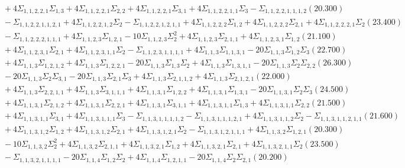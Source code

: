 \documentclass[12pt]{article}
\begin{document}
\begin{landscape}
\begin{align*}
		&\quad\quad +4\Sigma_{1,1,2,2,1}\Sigma_{1,3}+4\Sigma_{1,1,2,2,1}\Sigma_{2,2}+4\Sigma_{1,1,2,2,1}\Sigma_{3,1}+4\Sigma_{1,1,2,2,1,1}\Sigma_{3}-\Sigma_{1,1,2,2,1,1,1,2}(20.300) \\ 
		&\quad\quad -\Sigma_{1,1,2,2,1,1,2,1}+4\Sigma_{1,1,2,2,1,2}\Sigma_{2}-\Sigma_{1,1,2,2,1,2,1,1}+4\Sigma_{1,1,2,2,2}\Sigma_{1,2}+4\Sigma_{1,1,2,2,2}\Sigma_{2,1}+4\Sigma_{1,1,2,2,2,1}\Sigma_{2}(23.400) \\ 
		&\quad\quad -\Sigma_{1,1,2,2,2,1,1,1}+4\Sigma_{1,1,2,3}\Sigma_{1,2,1}-10\Sigma_{1,1,2,3}\Sigma_{2}^{2}+4\Sigma_{1,1,2,3}\Sigma_{2,1,1}+4\Sigma_{1,1,2,3,1}\Sigma_{1,2}(21.100) \\ 
		&\quad\quad +4\Sigma_{1,1,2,3,1}\Sigma_{2,1}+4\Sigma_{1,1,2,3,1,1}\Sigma_{2}-\Sigma_{1,1,2,3,1,1,1,1}+4\Sigma_{1,1,3}\Sigma_{1,1,3,1}-20\Sigma_{1,1,3}\Sigma_{1,2}\Sigma_{3}(22.700) \\ 
		&\quad\quad +4\Sigma_{1,1,3}\Sigma_{1,2,1,2}+4\Sigma_{1,1,3}\Sigma_{1,2,2,1}-20\Sigma_{1,1,3}\Sigma_{1,3}\Sigma_{2}+4\Sigma_{1,1,3}\Sigma_{1,3,1,1}-20\Sigma_{1,1,3}\Sigma_{2}\Sigma_{2,2}(26.300) \\ 
		&\quad\quad -20\Sigma_{1,1,3}\Sigma_{2}\Sigma_{3,1}-20\Sigma_{1,1,3}\Sigma_{2,1}\Sigma_{3}+4\Sigma_{1,1,3}\Sigma_{2,1,1,2}+4\Sigma_{1,1,3}\Sigma_{2,1,2,1}(22.000) \\ 
		&\quad\quad +4\Sigma_{1,1,3}\Sigma_{2,2,1,1}+4\Sigma_{1,1,3}\Sigma_{3,1,1,1}+4\Sigma_{1,1,3,1}\Sigma_{1,2,2}+4\Sigma_{1,1,3,1}\Sigma_{1,3,1}-20\Sigma_{1,1,3,1}\Sigma_{2}\Sigma_{3}(24.500) \\ 
		&\quad\quad +4\Sigma_{1,1,3,1}\Sigma_{2,1,2}+4\Sigma_{1,1,3,1}\Sigma_{2,2,1}+4\Sigma_{1,1,3,1}\Sigma_{3,1,1}+4\Sigma_{1,1,3,1,1}\Sigma_{1,3}+4\Sigma_{1,1,3,1,1}\Sigma_{2,2}(21.500) \\ 
		&\quad\quad +4\Sigma_{1,1,3,1,1}\Sigma_{3,1}+4\Sigma_{1,1,3,1,1,1}\Sigma_{3}-\Sigma_{1,1,3,1,1,1,1,2}-\Sigma_{1,1,3,1,1,1,2,1}+4\Sigma_{1,1,3,1,1,2}\Sigma_{2}-\Sigma_{1,1,3,1,1,2,1,1}(21.600) \\ 
		&\quad\quad +4\Sigma_{1,1,3,1,2}\Sigma_{1,2}+4\Sigma_{1,1,3,1,2}\Sigma_{2,1}+4\Sigma_{1,1,3,1,2,1}\Sigma_{2}-\Sigma_{1,1,3,1,2,1,1,1}+4\Sigma_{1,1,3,2}\Sigma_{1,2,1}(20.300) \\ 
		&\quad\quad -10\Sigma_{1,1,3,2}\Sigma_{2}^{2}+4\Sigma_{1,1,3,2}\Sigma_{2,1,1}+4\Sigma_{1,1,3,2,1}\Sigma_{1,2}+4\Sigma_{1,1,3,2,1}\Sigma_{2,1}+4\Sigma_{1,1,3,2,1,1}\Sigma_{2}(23.500) \\ 
		&\quad\quad -\Sigma_{1,1,3,2,1,1,1,1}-20\Sigma_{1,1,4}\Sigma_{1,2}\Sigma_{2}+4\Sigma_{1,1,4}\Sigma_{1,2,1,1}-20\Sigma_{1,1,4}\Sigma_{2}\Sigma_{2,1}(20.200) \\ 

\end{align*}
\end{landscape}
\end{document}
